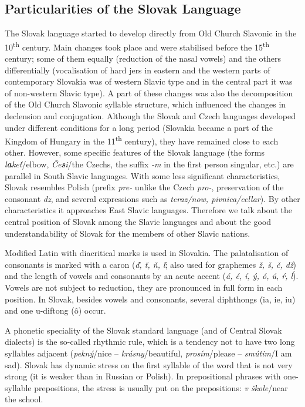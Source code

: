 \begin{multicols}{2}
\subsection{Particularities of the Slovak Language}
The Slovak language started to develop directly from Old Church Slavonic in the
10\textsuperscript{th} century. Main changes took place and were stabilised before the
15\textsuperscript{th} century; some of them equally (reduction of the nasal
vowels) and the others differentially (vocalisation of hard jers in eastern and
the western parts of contemporary Slovakia was of western Slavic type and in
the central part it was of non-western Slavic type). A part of these changes
was also the decomposition of the Old Church Slavonic syllable structure, which
influenced the changes in declension and conjugation. Although the Slovak and
Czech languages developed under different conditions for a long period
(Slovakia became a part of the Kingdom of Hungary in the 11\textsuperscript{th}
century), they have remained close to each other. However, some specific
features of the Slovak language (the forms \emph{l\textbf{a}keť}/elbow,
\emph{Če\textbf{s}i}/the Czechs, the suffix \emph{-m} in the first person
singular, etc.) are parallel in South Slavic languages. With some less
significant characteristics, Slovak resembles Polish (prefix \emph{pre-} unlike
the Czech \emph{pro-}, preservation of the consonant \emph{dz}, and several
expressions such as \emph{teraz/now, pivnica/cellar}). By other characteristics
it approaches East Slavic languages. Therefore we talk about the central
position of Slovak among the Slavic languages and about the good
understandability of Slovak for the members of other Slavic nations. 


Modified Latin with diacritical marks is used in Slovakia. The palatalisation of consonants is marked with a caron (\emph{ď, ť, ň, ľ}; also used for graphemes \emph{ž, š, č, dž}) and the length of vowels and consonants by an acute accent (\emph{á, é, í, ý, ó, ú, ŕ, ĺ}). Vowels are not subject to reduction, they are pronounced in full form in each position. In Slovak, besides vowels and consonants, several diphthongs (ia, ie, iu) and one u-diftong (ô) occur. 


A phonetic speciality of the Slovak standard language (and of Central Slovak dialects) is the so-called rhythmic rule, which is a tendency not to have two long syllables adjacent (\emph{pekný}/nice – \emph{krásny}/beautiful, \emph{prosím}/please – \emph{smútim}/I am sad). Slovak has dynamic stress on the first syllable of the word that is not very strong (it is weaker than in Russian or Polish). In prepositional phrases with one-syllable prepositions, the stress is usually put on the prepositions: \emph{v škole}/near the school.


\end{multicols}
